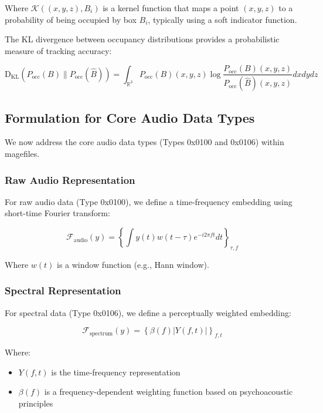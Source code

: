 Where $\mathcal{K}((x,y,z), B_i)$ is a kernel function that maps a point $(x,y,z)$ to a probability of being occupied by box $B_i$, typically using a soft indicator function.

The KL divergence between occupancy distributions provides a probabilistic measure of tracking accuracy:

\begin{equation}
\mathrm{D_{KL}}(P_{\text{occ}}(B) \| P_{\text{occ}}(\hat{B})) = \int_{\mathbb{R}^3} P_{\text{occ}}(B)(x,y,z) \log\frac{P_{\text{occ}}(B)(x,y,z)}{P_{\text{occ}}(\hat{B})(x,y,z)} dx dy dz
\end{equation}

\subsection{Formulation for Core Audio Data Types}

We now address the core audio data types (Types 0x0100 and 0x0106) within magefiles.

\subsubsection{Raw Audio Representation}

For raw audio data (Type 0x0100), we define a time-frequency embedding using short-time Fourier transform:

\begin{equation}
\mathcal{F}_{\text{audio}}(y) = \left\{ \int y(t) w(t-\tau) e^{-i2\pi ft} dt \right\}_{\tau,f}
\end{equation}

Where $w(t)$ is a window function (e.g., Hann window).

\subsubsection{Spectral Representation}

For spectral data (Type 0x0106), we define a perceptually weighted embedding:

\begin{equation}
\mathcal{F}_{\text{spectrum}}(y) = \left\{ \beta(f) |Y(f,t)| \right\}_{f,t}
\end{equation}

Where:
\begin{itemize}
\item $Y(f,t)$ is the time-frequency representation
\item $\beta(f)$ is a frequency-dependent weighting function based on psychoacoustic principles
\end{itemize}

